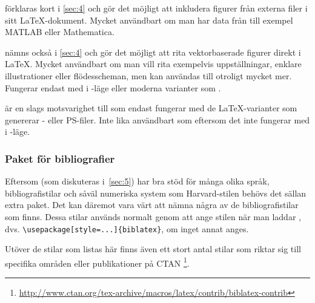 \documentclass[lang=sv,ptsize=10pt,font=none,nomath,titles=bf,../../a4.tex]{subfiles}
\begin{document}
\begin{description}
	\item[\pack{graphicx}]
	förklaras kort i \cref{sec:4} och gör det möjligt att inkludera
	figurer från externa filer i sitt \LaTeX-dokument. Mycket användbart
	om man har data från till exempel MATLAB eller Mathematica.
	
	\item[\pack{tikz}]
	nämns också i \cref{sec:4} och gör det möjligt att rita
	vektorbaserade figurer direkt i \LaTeX. Mycket användbart om man
	vill rita exempelvis uppställningar, enklare illustrationer eller 
	flödesscheman, men kan användas till otroligt mycket mer. Fungerar
	endast med \pdfLaTeX{} i \PDF-läge eller moderna varianter som
	\XeTeX.

	\item[\pack{pstricks}]
	är en slags motsvarighet till  som endast fungerar med de
	\LaTeX-varianter som genererar \DVI- eller \textsc{PS}-filer. Inte
	lika användbart som  eftersom det inte fungerar med 
	\pdfLaTeX{} i \PDF-läge.
\end{description}

\subsubsection{Paket för bibliografier}
Eftersom  (som diskuteras i~\cref{sec:5}) har bra stöd
för många olika språk, bibliografistilar och såväl numeriska system som
Harvard-stilen behövs det sällan extra paket. Det kan däremot vara värt
att nämna några av de bibliografistilar som finns. Dessa stilar används
normalt genom att ange stilen när man laddar , dvs.
\verb|\usepackage[style=...]{biblatex}|,
om inget annat anges.

Utöver de stilar som listas här finns även ett stort antal stilar som
riktar sig till specifika områden eller publikationer på CTAN%
\footnote{\url{http://www.ctan.org/tex-archive/macros/latex/contrib/biblatex-contrib}}.
\end{document}
